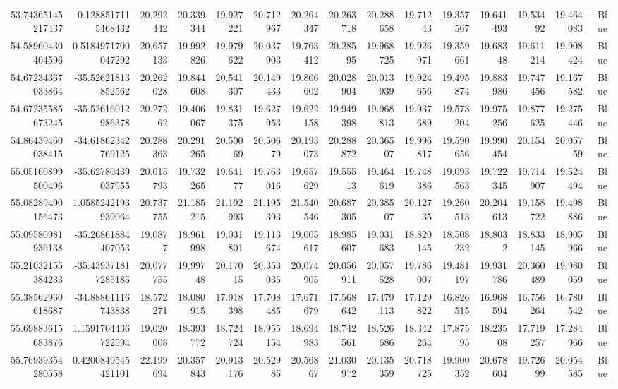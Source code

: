 \begin{center}
\begin{longtable}{rrrrrrrrrrrrrrr}
53.74365145217437 & -0.1288517115468432 & 20.292442 & 20.339344 & 19.927221 & 20.712967 & 20.264347 & 20.263718 & 20.288658 & 19.71243 & 19.357567 & 19.641493 & 19.53492 & 19.464083 & Blue \\
54.58960430404596 & 0.5184971700047292 & 20.657133 & 19.992826 & 19.979622 & 20.037903 & 19.763412 & 20.28595 & 19.968725 & 19.926971 & 19.359661 & 19.68348 & 19.611214 & 19.908424 & Blue \\
54.67234367033864 & -35.52621813852562 & 20.262028 & 19.844608 & 20.541307 & 20.149433 & 19.806602 & 20.028904 & 20.013939 & 19.924656 & 19.495874 & 19.883986 & 19.747456 & 19.167582 & Blue \\
54.67235585673245 & -35.52616012986378 & 20.27262 & 19.406067 & 19.831375 & 19.627953 & 19.622158 & 19.949398 & 19.968813 & 19.937689 & 19.573204 & 19.975256 & 19.877625 & 19.275446 & Blue \\
54.86439460038415 & -34.61862342769125 & 20.288363 & 20.291265 & 20.50069 & 20.50679 & 20.193073 & 20.288872 & 20.36507 & 19.996817 & 19.590656 & 19.990454 & 20.154 & 20.05759 & Blue \\
55.05160899500496 & -35.62780439037955 & 20.015793 & 19.732265 & 19.64177 & 19.763016 & 19.657629 & 19.55513 & 19.464619 & 19.748386 & 19.093563 & 19.722345 & 19.714907 & 19.524494 & Blue \\
55.08289490156473 & 1.0585242193939064 & 20.737755 & 21.185215 & 21.192993 & 21.195393 & 21.540546 & 20.687305 & 20.38507 & 20.12735 & 19.260513 & 20.204613 & 19.158722 & 19.498886 & Blue \\
55.09580981936138 & -35.26861884407053 & 19.0877 & 18.961998 & 19.031801 & 19.113674 & 19.005617 & 18.985607 & 19.031683 & 18.820145 & 18.508232 & 18.8032 & 18.833145 & 18.905966 & Blue \\
55.21032155384233 & -35.439371817285185 & 20.077755 & 19.99748 & 20.17015 & 20.353035 & 20.074905 & 20.056911 & 20.057528 & 19.786007 & 19.481197 & 19.931786 & 20.360489 & 19.980059 & Blue \\
55.38562960618687 & -34.88861116743838 & 18.572271 & 18.080915 & 17.918398 & 17.708485 & 17.671679 & 17.568642 & 17.479113 & 17.129822 & 16.826515 & 16.968594 & 16.756264 & 16.780542 & Blue \\
55.69883615683876 & 1.1591704436722594 & 19.020008 & 18.393772 & 18.724724 & 18.955154 & 18.694983 & 18.742561 & 18.526686 & 18.342264 & 17.87595 & 18.23508 & 17.719257 & 17.284966 & Blue \\
55.76939354280558 & 0.4200849545421101 & 22.199694 & 20.357843 & 20.913176 & 20.52985 & 20.56867 & 21.030972 & 20.135359 & 20.718725 & 19.900352 & 20.678604 & 19.72699 & 20.054585 & Blue \\

\end{longtable}
\end{center}
